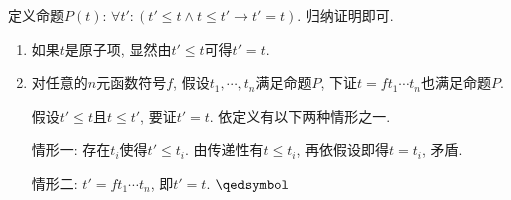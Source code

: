 
定义命题$P(t)$: $\forall t':
(t'\leqslant t\land t\leqslant t'\to t'=t)$. 归纳证明即可.

\begin{enumerate}
    \item 如果$t$是原子项, 显然由$t'\leqslant t$可得$t'=t$.
    \item 对任意的$n$元函数符号$f$, 假设$t_1,\cdots,t_n$满足命题$P$,
    下证$t=ft_1\cdots t_n$也满足命题$P$.

    \hspace{2.17em}
    假设$t'\leqslant t$且$t\leqslant t'$, 要证$t'=t$. 依定义有以下两种情形之一.

    \hspace{2.17em}
    情形一: 存在$t_i$使得$t'\leqslant t_i$. 由传递性有$t\leqslant t_i$,
    再依假设即得$t=t_i$, 矛盾.

    \hspace{2.17em}
    情形二: $t'=ft_1\cdots t_n$, 即$t'=t$. \hfill $\qedsymbol$
\end{enumerate}

